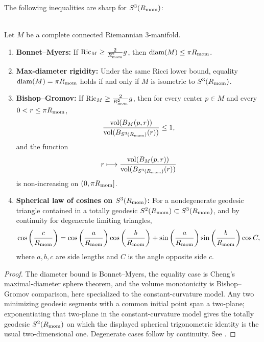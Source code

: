\documentclass[11pt]{article}
\begin{document}
The following inequalities are sharp for \(S^3(R_{\mathrm{mom}})\):

\begin{theorem}
\label{p1a:theorem:atlas-comparison-theorems-and-model-identities-12bca99}

\mbox{}\\[6pt] 
Let \(M\) be a complete connected Riemannian \(3\)-manifold.
\begin{enumerate}
\item \textbf{Bonnet--Myers:} If \(\mathrm{Ric}_M \geq \frac{2}{R_{\mathrm{mom}}^2} g\), then \(\mathrm{diam}(M) \leq \pi R_{\mathrm{mom}}\).
\item \textbf{Max-diameter rigidity:} Under the same Ricci lower bound, equality \(\mathrm{diam}(M)=\pi R_{\mathrm{mom}}\) holds if and only if \(M\) is isometric to \(S^3(R_{\mathrm{mom}})\).
\item \textbf{Bishop--Gromov:} If \(\mathrm{Ric}_M \geq \frac{2}{R_{\mathrm{mom}}^2} g\), then for every center \(p\in M\) and every \(0<r\leq \pi R_{\mathrm{mom}}\),
\[
\frac{\mathrm{vol}(B_M(p,r))}{\mathrm{vol}(B_{S^3(R_{\mathrm{mom}})}(r))} \leq 1,
\]
and the function
\[
r \longmapsto \frac{\mathrm{vol}(B_M(p,r))}{\mathrm{vol}(B_{S^3(R_{\mathrm{mom}})}(r))}
\]
is non-increasing on \((0,\pi R_{\mathrm{mom}}]\).
\item \textbf{Spherical law of cosines on \(S^3(R_{\mathrm{mom}})\):} For a nondegenerate geodesic triangle contained in a totally geodesic \(S^2(R_{\mathrm{mom}})\subset S^3(R_{\mathrm{mom}})\), and by continuity for degenerate limiting triangles,
\[
\cos\left(\frac{c}{R_{\mathrm{mom}}}\right)
=
\cos\left(\frac{a}{R_{\mathrm{mom}}}\right)\cos\left(\frac{b}{R_{\mathrm{mom}}}\right)
+
\sin\left(\frac{a}{R_{\mathrm{mom}}}\right)\sin\left(\frac{b}{R_{\mathrm{mom}}}\right)\cos C,
\]
where \(a,b,c\) are side lengths and \(C\) is the angle opposite side \(c\).
\end{enumerate}
\cite{do1992riemannian,besse1978manifolds}
\end{theorem}

\begin{proof}
The diameter bound is Bonnet--Myers, the equality case is Cheng's maximal-diameter sphere theorem, and the volume monotonicity is Bishop--Gromov comparison, here specialized to the constant-curvature model. Any two minimizing geodesic segments with a common initial point span a two-plane; exponentiating that two-plane in the constant-curvature model gives the totally geodesic \(S^2(R_{\mathrm{mom}})\) on which the displayed spherical trigonometric identity is the usual two-dimensional one. Degenerate cases follow by continuity. See \cite{do1992riemannian,besse1978manifolds}.
\end{proof}
\end{document}
